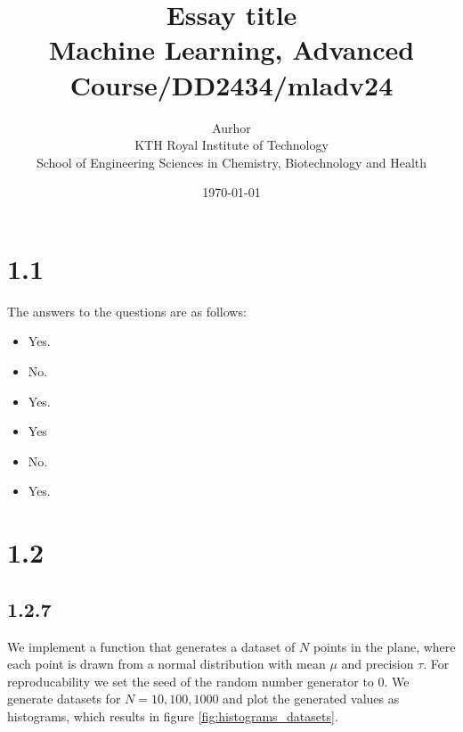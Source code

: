\documentclass{article}
\title{Essay title\\\Large{Machine Learning, Advanced Course/DD2434/mladv24}}
\author{Aurhor \\ KTH Royal Institute of Technology\\ School of Engineering Sciences in Chemistry, Biotechnology and Health}
\date{\today}
\begin{document}
\maketitle

\fancyfoot[C]{\thepage}
\begin{multicols}{2}

    \section*{1.1}
    The answers to the questions are as follows:
    \begin{itemize}[noitemsep, topsep=0pt]
        \item Yes.
        \item No.
        \item Yes.
        \item Yes
        \item No.
        \item Yes.
    \end{itemize}

    \section*{1.2}

    \subsection*{1.2.7}
    We implement a function that generates a dataset of $N$ points in the plane, where each point is drawn from a normal distribution with mean $\mu$ and precision $\tau$. For reproducability we set the seed of the random number generator to 0. We generate datasets for $N = 10, 100, 1000$ and plot the generated values as histograms, which results in figure \autoref{fig:histograms_datasets}. 


\end{multicols}
\end{document}
